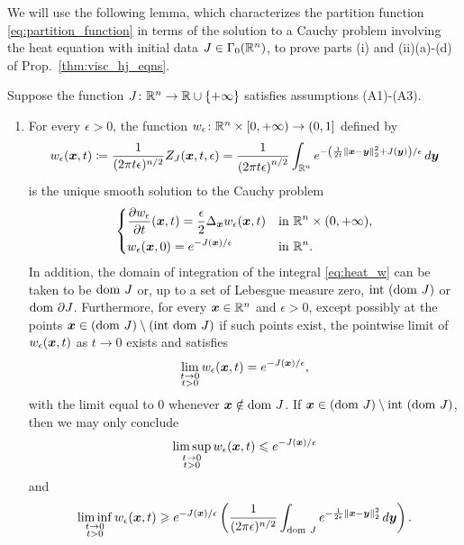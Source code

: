 We will use the following lemma, which characterizes the partition function \eqref{eq:partition_function} in terms of the solution to a Cauchy problem involving the heat equation with initial data $J \in \Gamma_0(\mathbb{R}^n)$, to prove parts (i) and (ii)(a)-(d) of Prop.~\ref{thm:visc_hj_eqns}.

\begin{lem} \label{lem:heat_eqn}
Suppose the function $J\colon \mathbb{R}^n \to \mathbb{R}\cup\{+\infty\}$ satisfies assumptions (A1)-(A3).
\begin{enumerate}
\item[(i)] For every $\epsilon>0$, the function $w_\epsilon\colon\mathbb{R}^n\times[0,+\infty)\to (0,1]$ defined by
\begin{equation}
w_{\epsilon}(\boldsymbol{x},t)\coloneqq \frac{1}{(2\pi t \epsilon)^{n/2}}Z_J(\boldsymbol{x},t,\epsilon) = \frac{1}{\left(2\pi t\epsilon\right)^{n/2}}\int_{\mathbb{R}^n}e^{-\left(\frac{1}{2t}\left\Vert \boldsymbol{x}-\boldsymbol{y}\right\Vert _{2}^{2}+J(\boldsymbol{y})\right)/\epsilon}\mathop{}\!d\boldsymbol{y}\label{eq:heat_w}
\end{equation}
is the unique smooth solution to the Cauchy problem
\begin{equation}
\begin{dcases}
\frac{\partial w_{\epsilon}}{\partial t}(\boldsymbol{x},t)=\frac{\epsilon}{2}\Delta_{\boldsymbol x} w_{\epsilon}(\boldsymbol{x},t) & \mbox{in }\mathbb{R}^n\times(0,+\infty),\\
w_{\epsilon}(\boldsymbol{x},0)=e^{-J(\boldsymbol{x})/\epsilon} & \mbox{in }\mathbb{R}^n.
\end{dcases}\label{eq:cauchy_heat_prob}
\end{equation}
In addition, the domain of integration of the integral \eqref{eq:heat_w} can be taken to be $\mathrm{dom~} J$ or, up to a set of Lebesgue measure zero, $\mathrm{int~}(\mathrm{dom~} J)$
or $\mathrm{dom~}\partial J$. Furthermore, for every $\boldsymbol{x}\in\mathbb{R}^n$ and $\epsilon > 0$, except possibly at the points $\boldsymbol{x}\in(\mathrm{dom~} J)\setminus(\mathrm{int~}\mathrm{dom~} J)$ if such points exist, the pointwise limit of $w_\epsilon(\boldsymbol{x},t)$ as $t \to 0$ exists and satisfies
\begin{equation*}
\lim_{\substack{t\to0\\ t>0}}w_{\epsilon}(\boldsymbol{x},t)=e^{-J(\boldsymbol{x})/\epsilon},
\end{equation*}
with the limit equal to $0$ whenever $\boldsymbol{x}\notin\mathrm{dom~} J$. If $\boldsymbol{x}\in(\mathrm{dom~} J)\setminus\mathrm{int~}(\mathrm{dom~} J)$, then we may only conclude 
\[
\limsup_{\substack{t\to0\\t>0}}w_{\epsilon}(\boldsymbol{x},t)\leqslant e^{-J(\boldsymbol{x})/\epsilon}
\]
and
\[
\liminf_{\substack{t\to0\\t>0}}w_{\epsilon}(\boldsymbol{x},t)\geqslant e^{-J(\boldsymbol{x})/\epsilon}\left(\frac{1}{(2\pi\epsilon)^{n/2}}\int_{\mathrm{dom~} J}e^{-\frac{1}{2\epsilon}\left\Vert \boldsymbol{x}-\boldsymbol{y}\right\Vert _{2}^{2}}\mathop{}\!d\boldsymbol{y}\right).
\]


\end{enumerate}
\end{lem}
